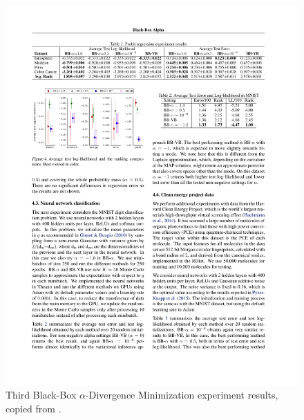 \documentclass[12pt,vu]{adammath}
\theoremstyle{plain}
\theoremstyle{definition}
\theoremstyle{remark}
\begin{document}
\begin{figure}[p]\label{f:bbalpha3}
  \centering\includegraphics{figures/from-bb-alpha-3.pdf}
  \caption{Third Black-Box $\alpha$-Divergence Minimization experiment results, copied from \cite{bbalpha}.}
\end{figure}
\end{document}
